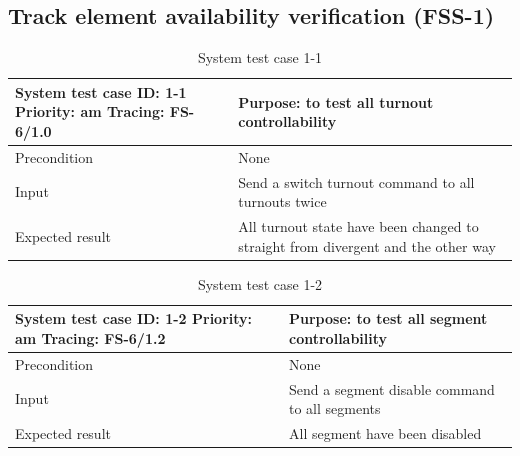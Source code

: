 \subsection{Track element availability verification (FSS-1)}
\begin{table}[H]
	\caption{System test case 1-1}
	\label{table:TCase-FSS1-1}
	\begin{center}
		\renewcommand{\arraystretch}{1.8}
		\begin{tabu} 
			to 0.9 \textwidth
			{  X[0.4, c] X[c] }
			\toprule
			System test case ID: 1-1 \newline Priority: am \newline Tracing: FS-6/1.0 & Purpose: to test all turnout controllability                                    \\ \midrule
			Precondition                                                              & None                                                                            \\
			Input                                                                     & Send a switch turnout command to all turnouts twice                                \\
			Expected result                                                           & All turnout state have been changed to straight from divergent and the other way \\ \bottomrule
		\end{tabu}
	\end{center}
\end{table}

\begin{table}[H]
	\caption{System test case 1-2}
	\label{table:TCase-FSS1-2}
	\begin{center}
		\renewcommand{\arraystretch}{1.8}
		\begin{tabu} 
			to 0.9 \textwidth
			{  X[0.4, c] X[c] }
			\toprule
			System test case ID: 1-2 \newline Priority: am \newline Tracing: FS-6/1.2 & Purpose: to test all segment controllability   \\ \midrule
			Precondition                                                              & None                                           \\
			Input                                                                     & Send a segment disable command to all segments \\
			Expected result                                                           & All segment have been disabled                 \\ \bottomrule
		\end{tabu}
	\end{center}
\end{table}

